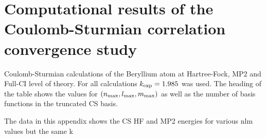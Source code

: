 \chapter{Computational results of the Coulomb-Sturmian correlation convergence study}
\label{apx:CSCorrelationConvergence}


\begin{table}
	\centering
	
	\caption{Coulomb-Sturmian calculations of the Beryllium atom
		at Hartree-Fock, MP2 and Full-CI level of theory.
		For all calculations $k_\text{exp} = 1.985$ was used.
		The heading of the table shows the values for
		$(n_\text{max}, l_\text{max}, m_\text{max})$ as well as the
		number of basis functions
		in the truncated CS basis.}
	\label{tab:CStruncationEnergies}
\end{table}


The data in this appendix shows the CS HF and MP2 energies
for various nlm values but the same k
\begin{landscape}

\end{landscape}
